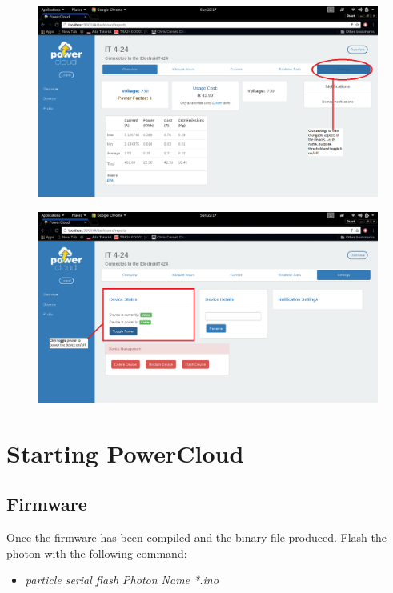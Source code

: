 \documentclass[a4paper,10pt]{article}
\begin{document}
				\begin{figure}[H]
							\includegraphics[scale=0.3]{images/settings1.png}
				\end{figure}
				
				\begin{figure}[H]
							\includegraphics[scale=0.3]{images/settings.png}
				\end{figure}
			
			\newpage
	\section{Starting PowerCloud}
		\subsection{Firmware}
			Once the firmware has been compiled and the binary file produced. Flash the photon with the following command:
			
			\begin{itemize}
				\item \textit{particle serial flash Photon Name *.ino}
			\end{itemize}
			
\end{document}
